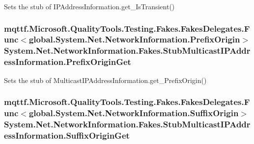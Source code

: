 Sets the stub of I\-P\-Address\-Information.\-get\-\_\-\-Is\-Transient()

\hypertarget{class_system_1_1_net_1_1_network_information_1_1_fakes_1_1_stub_multicast_i_p_address_information_a425159652cdc15d3ef9cc56569812d5c}{
\subsubsection[{Prefix\-Origin\-Get}]{\setlength{\rightskip}{0pt plus 5cm}mqttf.\-Microsoft.\-Quality\-Tools.\-Testing.\-Fakes.\-Fakes\-Delegates.\-Func$<$global.\-System.\-Net.\-Network\-Information.\-Prefix\-Origin$>$ System.\-Net.\-Network\-Information.\-Fakes.\-Stub\-Multicast\-I\-P\-Address\-Information.\-Prefix\-Origin\-Get}}\label{class_system_1_1_net_1_1_network_information_1_1_fakes_1_1_stub_multicast_i_p_address_information_a425159652cdc15d3ef9cc56569812d5c}


Sets the stub of Multicast\-I\-P\-Address\-Information.\-get\-\_\-\-Prefix\-Origin()

\hypertarget{class_system_1_1_net_1_1_network_information_1_1_fakes_1_1_stub_multicast_i_p_address_information_a1d0c7639b38005a2b592f2842265cc9b}{
\subsubsection[{Suffix\-Origin\-Get}]{\setlength{\rightskip}{0pt plus 5cm}mqttf.\-Microsoft.\-Quality\-Tools.\-Testing.\-Fakes.\-Fakes\-Delegates.\-Func$<$global.\-System.\-Net.\-Network\-Information.\-Suffix\-Origin$>$ System.\-Net.\-Network\-Information.\-Fakes.\-Stub\-Multicast\-I\-P\-Address\-Information.\-Suffix\-Origin\-Get}}\label{class_system_1_1_net_1_1_network_information_1_1_fakes_1_1_stub_multicast_i_p_address_information_a1d0c7639b38005a2b592f2842265cc9b}


